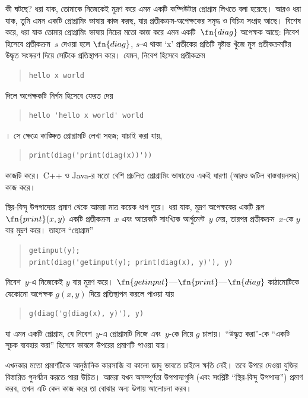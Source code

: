 \documentclass[../../../include/open-logic-section]{subfiles}
\begin{document}
\begin{explain}
কী ঘটছে? ধরা যাক, তোমাকে নিজেকেই মুদ্রণ করে এমন একটি কম্পিউটার প্রোগ্রাম
লিখতে বলা হয়েছে। আরও ধরা যাক, তুমি এমন একটি প্রোগ্রামিং ভাষায় কাজ করছ,
যার প্রতীকক্রম-অপেক্ষকের সমৃদ্ধ ও বিচিত্র সংগ্রহ আছে। বিশেষ করে, ধরা যাক
তোমার প্রোগ্রামিং ভাষায় নিচের মতো কাজ করে এমন একটি~$\fn{diag}$ অপেক্ষক
আছে: নিবেশ হিসেবে প্রতীকক্রম~$s$ দেওয়া হলে $\fn{diag}$, $s$-এ থাকা
`x' প্রতীকের প্রতিটি দৃষ্টান্ত খুঁজে মূল প্রতীকক্রমটির উদ্ধৃত সংস্করণ দিয়ে
সেটিকে প্রতিস্থাপন করে। যেমন, নিবেশ হিসেবে প্রতীকক্রম
\begin{quote}
\begin{verbatim}
hello x world
\end{verbatim}
\end{quote}
দিলে অপেক্ষকটি নির্গম হিসেবে ফেরত দেয়
\begin{quote}
\begin{verbatim}
hello 'hello x world' world
\end{verbatim}
\end{quote}
। সে ক্ষেত্রে কাঙ্ক্ষিত প্রোগ্রামটি লেখা সহজ; যাচাই করা যায়,
\begin{quote}
\begin{verbatim}
print(diag('print(diag(x))'))
\end{verbatim}
\end{quote}
কাজটি করে। C++ ও Java-র মতো বেশি প্রচলিত প্রোগ্রামিং ভাষাতেও একই ধারণা
(আরও জটিল বাস্তবায়নসহ) কাজ করে।

স্থির-বিন্দু উপপাদ্যের প্রমাণ থেকে আমরা মাত্র কয়েক ধাপ দূরে। ধরা যাক,
মুদ্রণ অপেক্ষকের একটি রূপ~$\fn{print}(x,y)$ একটি প্রতীকক্রম~$x$ এবং আরেকটি
সাংখ্যিক আর্গুমেন্ট~$y$ নেয়, তারপর প্রতীকক্রম~$x$-কে $y$ বার মুদ্রণ করে।
তাহলে “প্রোগ্রাম”
\begin{quote}
\begin{verbatim}
getinput(y);
print(diag('getinput(y); print(diag(x), y)'), y)
\end{verbatim}
\end{quote}
নিবেশ~$y$-এ নিজেকেই $y$ বার মুদ্রণ করে।
$\fn{getinput}$---$\fn{print}$---$\fn{diag}$ কাঠামোটিকে যেকোনো অপেক্ষক
$g(x,y)$ দিয়ে প্রতিস্থাপন করলে পাওয়া যায়
\begin{quote}
\begin{verbatim}
g(diag('g(diag(x), y)'), y)
\end{verbatim}
\end{quote}
যা এমন একটি প্রোগ্রাম, যে নিবেশ~$y$-এ প্রোগ্রামটি নিজে এবং~$y$-কে নিয়ে
$g$ চালায়। “উদ্ধৃত করা”-কে “একটি সূচক ব্যবহার করা” হিসেবে ভাবলে উপরের
প্রমাণটি পাওয়া যায়।

এখনকার মতো প্রমাণটিকে আনুষ্ঠানিক কারসাজি বা কালো জাদু ভাবতে চাইলে ক্ষতি
নেই। তবে উপরে দেওয়া যুক্তির বিস্তারিত পুনর্গঠন করতে পারা উচিত। আমরা যখন
অসম্পূর্ণতা উপপাদ্যগুলি (এবং সংশ্লিষ্ট “স্থির-বিন্দু উপপাদ্য”) প্রমাণ করব,
তখন এটি কেন কাজ করে তা বোঝার অন্য উপায় আলোচনা করব।
\end{explain}
\end{document}
